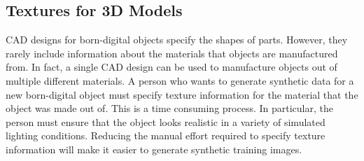 \subsection{Textures for 3D Models}

CAD designs for born-digital objects specify the shapes of parts.
However, they rarely include information about the materials that objects are
manufactured from.
In fact, a single CAD design can be used to manufacture objects out of multiple
different materials.
A person who wants to generate synthetic data for a new born-digital object must
specify texture information for the material that the object was made out of.
This is a time consuming process.
In particular, the person must ensure that the object looks realistic in a
variety of simulated lighting conditions.
Reducing the manual effort required to specify texture information will make it
easier to generate synthetic training images.
